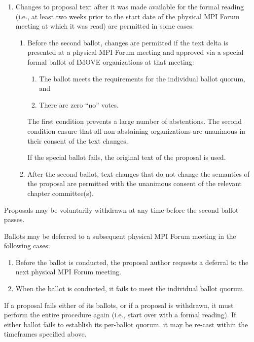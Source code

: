 \begin{enumerate}
\item Changes to proposal text after it was made available for the
  formal reading (i.e., at least two weeks prior to the start date of
  the physical MPI Forum meeting at which it was read) are permitted
  in some cases:
  \begin{enumerate}
  \item Before the second ballot, changes are permitted if the text
    delta is presented at a physical MPI Forum meeting and approved
    via a special formal ballot of IMOVE organizations at that
    meeting:
    \begin{enumerate}
    \item The ballot meets the requirements for the individual
      ballot quorum, and
    \item There are zero ``no'' votes.
    \end{enumerate}
    
    \begin{rationale}
      The first condition prevents a large number of abstentions.
      The second condition ensure that all non-abstaining
      organizations are unanimous in their consent of the text
      changes.
    \end{rationale}
    
    If the special ballot fails, the original text of the proposal
    is used.

  \item After the second ballot, text changes that do not change the
    semantics of the proposal are permitted with the unanimous consent
    of the relevant chapter committee(s).
  \end{enumerate}
\end{enumerate}

Proposals may be voluntarily withdrawn at any time before the second
ballot passes.

Ballots may be deferred to a subsequent physical MPI Forum meeting in
the following cases:

\begin{enumerate}
\item Before the ballot is conducted, the proposal author requests a
  deferral to the next physical MPI Forum meeting.
\item When the ballot is conducted, it fails to meet the individual
  ballot quorum.
\end{enumerate}

If a proposal fails either of its ballots, or if a proposal is
withdrawn, it must perform the entire procedure again (i.e., start
over with a formal reading).  If either ballot fails to establish its
per-ballot quorum, it may be re-cast within the timeframes specified
above.

